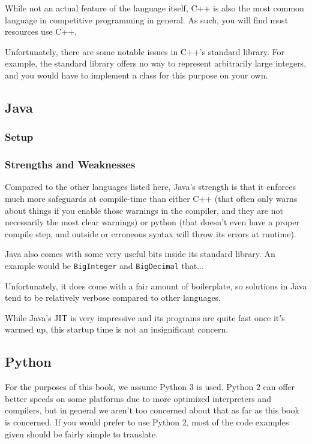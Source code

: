 While not an actual feature of the language itself, C++ is also the most common language in competitive programming in general. As such, you will find most resources use C++.

Unfortunately, there are some notable issues in C++'s standard library. For example, the standard library offers no way to represent arbitrarily large integers, and you would have to implement a class for this purpose on your own.

\subsection{Java}

\subsubsection{Setup}

\subsubsection{Strengths and Weaknesses}

Compared to the other languages listed here, Java's strength is that it enforces much more safeguards at compile-time than either C++ (that often only warns about things if you enable those warnings in the compiler, and they are not necessarily the most clear warnings) or python (that doesn't even have a proper compile step, and outside or erroneous syntax will throw its errors at runtime).

Java also comes with some very useful bits inside its standard library. An example would be \texttt{BigInteger} and \texttt{BigDecimal} that...

Unfortunately, it does come with a fair amount of boilerplate, so solutions in Java tend to be relatively verbose compared to other languages.

While Java's JIT is very impressive and its programs are quite fast once it's warmed up, this startup time is not an insignificant concern.

\subsection{Python}

For the purposes of this book, we assume Python 3 is used. Python 2 can offer better speeds on some platforms due to more optimized interpreters and compilers, but in general we aren't too concerned about that as far as this book is concerned. If you would prefer to use Python 2, most of the code examples given should be fairly simple to translate.

